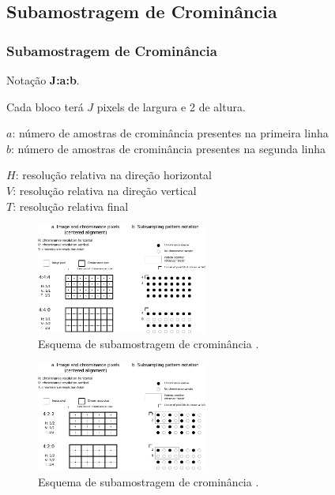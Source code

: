 \subsection{Subamostragem de Crominância}
\begin{frame}[allowframebreaks]
  \frametitle{Subamostragem de Crominância}
  Notação \textbf{J:a:b}.

  Cada bloco terá $J$ pixels de largura e 2 de altura.

  $a$: número de amostras de crominância presentes na primeira linha \\
  $b$: número de amostras de crominância presentes na segunda linha

  $H$: resolução relativa na direção horizontal\\
  $V$: resolução relativa na direção vertical\\
  $T$: resolução relativa final

  \framebreak

  \begin{figure}[h!]
  \centering
  \includegraphics[width=0.5\textwidth]{images/chromasubsamplefig01.pdf}
  \caption{Esquema de subamostragem de crominância \citep{kerr2012}.}
  \label{fig:chromasubsamplefig01}
  \end{figure}

  \framebreak

  \begin{figure}[h!]
  \centering
  \includegraphics[width=0.5\textwidth]{images/chromasubsamplefig02.pdf}
  \caption{Esquema de subamostragem de crominância \citep{kerr2012}.}
  \label{fig:chromasubsamplefig02}
  \end{figure}


\end{frame}
